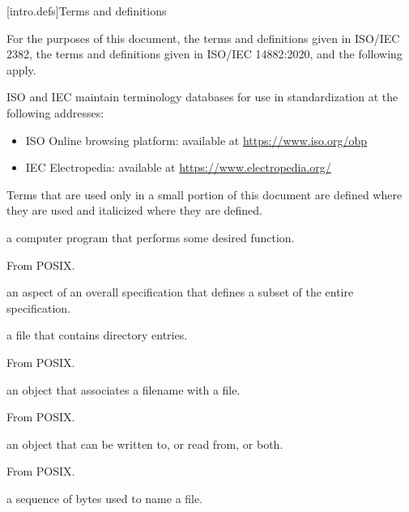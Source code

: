 
[intro.defs]{Terms and definitions}

\pnum
{}%
For the purposes of this document,
the terms and definitions given in ISO/IEC 2382,
the terms and definitions given in ISO/IEC 14882:2020,
and the following apply.

\pnum
ISO and IEC maintain terminology databases for use in standardization
at the following addresses:
\begin{itemize}
\item ISO Online browsing platform: available at \url{https://www.iso.org/obp}
\item IEC Electropedia: available at \url{https://www.electropedia.org/}
\end{itemize}

\pnum
Terms that are used only in a small portion of this document are defined where
they are used and italicized where they are defined.

%
a computer program that performs some desired function.

\begin{defnote}
From POSIX.
\end{defnote}

%
an aspect of an overall specification that defines a subset of the entire
specification.

%
a file that contains directory entries.

\begin{defnote}
From POSIX.
\end{defnote}

%
an object that associates a filename with a file.

\begin{defnote}
From POSIX.
\end{defnote}

%
an object that can be written to, or read from, or both.

\begin{defnote}
From POSIX.
\end{defnote}

%
a sequence of bytes used to name a file.

